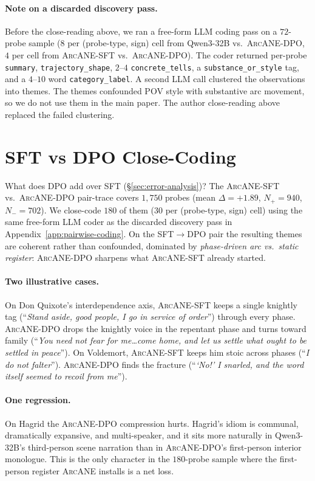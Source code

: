 \documentclass{llmxive}
\providecommand{\ours}{\textsc{ArcANE}}
\begin{document}
\paragraph{Note on a discarded discovery pass.}
Before the close-reading above, we ran a free-form LLM coding pass on a $72$-probe sample ($8$ per (probe-type, sign) cell from Qwen3-32B vs.\ \ours{}-DPO, $4$ per cell from \ours{}-SFT vs.\ \ours{}-DPO). The coder returned per-probe \texttt{summary}, \texttt{trajectory\_shape}, $2$--$4$ \texttt{concrete\_tells}, a \texttt{substance\_or\_style} tag, and a $4$--$10$ word \texttt{category\_label}. A second LLM call clustered the observations into themes. The themes confounded POV style with substantive arc movement, so we do not use them in the main paper. The author close-reading above replaced the failed clustering.


\section{SFT vs DPO Close-Coding\label{app:sft-vs-dpo}}

What does DPO add over SFT (\S\ref{sec:error-analysis})? The \ours{}-SFT vs.\ \ours{}-DPO pair-trace covers $1{,}750$ probes (mean $\Delta{=}{+}1.89$, $N_{+}{=}940$, $N_{-}{=}702$). We close-code $180$ of them ($30$ per (probe-type, sign) cell) using the same free-form LLM coder as the discarded discovery pass in Appendix~\ref{app:pairwise-coding}. On the SFT$\to$DPO pair the resulting themes are coherent rather than confounded, dominated by \emph{phase-driven arc vs.\ static register}: \ours{}-DPO sharpens what \ours{}-SFT already started.

\paragraph{Two illustrative cases.}
On Don Quixote's interdependence axis, \ours{}-SFT keeps a single knightly tag (``\emph{Stand aside, good people, I go in service of order}'') through every phase. \ours{}-DPO drops the knightly voice in the repentant phase and turns toward family (``\emph{You need not fear for me\ldots come home, and let us settle what ought to be settled in peace}''). On Voldemort, \ours{}-SFT keeps him stoic across phases (``\emph{I do not falter}''). \ours{}-DPO finds the fracture (``\emph{`No!' I snarled, and the word itself seemed to recoil from me}'').

\paragraph{One regression.}
On Hagrid the \ours{}-DPO compression hurts. Hagrid's idiom is communal, dramatically expansive, and multi-speaker, and it sits more naturally in Qwen3-32B's third-person scene narration than in \ours{}-DPO's first-person interior monologue. This is the only character in the $180$-probe sample where the first-person register \ours{} installs is a net loss.
\end{document}
